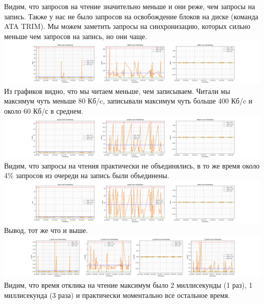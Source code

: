 Видим, что запросов на чтение значительно меньше и они реже, чем запросы на запись. Также у нас не было запросов на освобождение блоков на диске (команда ATA TRIM). Мы можем заметить запросы на синхронизацию, которых сильно меньше чем запросов на запись, но они чаще.
\includegraphics[width=\textwidth]{./io/image/iostat_2.png}
Из графиков видно, что мы читаем меньше, чем записываем. Читали мы максимум чуть меньше 80 Кб/c, записывали максимум чуть больше 400 Кб/c и около 60 Кб/с в среднем.
\includegraphics[width=\textwidth]{./io/image/iostat_3.png}
Видим, что запросы на чтения практически не объединялись, в то же время около 4\% запросов из очереди на запись были объединены.
\includegraphics[width=\textwidth]{./io/image/iostat_4.png}
Вывод, тот же что и выше.
\includegraphics[width=\textwidth]{./io/image/iostat_5.png}
Видим, что время отклика на чтение максимум было 2 миллисекунды (1 раз), 1 миллисекунда (3 раза) и практически моментально все остальное время.\\

